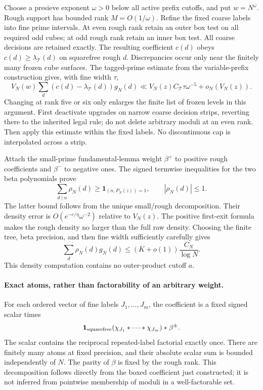 Choose a presieve exponent $\omega>0$ below all active prefix cutoffs,
and put $w=N^\omega$. Rough support has bounded rank $M=O(1/\omega)$.
Refine the fixed coarse labels into fine prime intervals. At even
rough rank retain an outer box test on all required odd cubes; at odd
rough rank retain an inner box test. All coarse decisions are retained
exactly. The resulting coefficient $c(d)$ obeys
$c(d)\ge\lambda_{\mathcal T}(d)$ on squarefree rough $d$.
Discrepancies occur only near the finitely many frozen cube surfaces.
The tagged-prime estimate from the variable-prefix construction gives,
with fine width $\tau$,
\[
 V_N(w)\sum_d(c(d)-\lambda_{\mathcal T}(d))g_N(d)
 \ll V_N(z)C_{\mathcal T}\tau\omega^{-5}+o_N(V_N(z)).
\]
Changing at rank five or six only enlarges the finite list of frozen
levels in this argument. First deactivate upgrades on narrow coarse decision strips, reverting
there to the inherited legal rule; do not delete arbitrary moduli at an
even rank. Then apply this estimate within the fixed labels. No
discontinuous cap is interpolated across a strip.

Attach the small-prime fundamental-lemma weight $\beta^+$ to positive
rough coefficients and $\beta^-$ to negative ones. The signed
termwise inequalities for the two beta polynomials prove
\begin{equation}\label{eq:lower-k-compiled-majorant}
 \sum_{d\mid n}\rho_N(d)\ge\mathbf1_{(n,P_N(z))=1},
 \qquad |\rho_N(d)|\le1.
\end{equation}
The latter bound follows from the unique small/rough decomposition.
Their density error is $O(e^{-c/\eta}\omega^{-2})$ relative to $V_N(z)$.
The positive first-exit formula makes the rough density no larger
than the full raw density. Choosing the finite tree, beta precision,
and then fine width sufficiently carefully gives
\begin{equation}\label{eq:lower-k-compiled-density}
 \sum_d\rho_N(d)g_N(d)\le(K+o(1))\frac{C_N}{\log N}.
\end{equation}
This density computation contains no outer-product cutoff $a$.

\paragraph{Exact atoms, rather than factorability of an arbitrary weight.}
For each ordered vector of fine labels $J_1,\ldots,J_m$, the coefficient
is a fixed signed scalar times
\[
 \mathbf1_{\rm squarefree}
 (\chi_{J_1}*\cdots*\chi_{J_m})*\beta^\pm.
\]
The scalar contains the reciprocal repeated-label factorial exactly
once. There are finitely many atoms at fixed precision, and their
absolute scalar sum is bounded independently of $N$. The parity of
$\beta$ is fixed by the rough rank. This decomposition follows directly
from the boxed coefficient just constructed; it is not inferred from
pointwise membership of moduli in a well-factorable set.

